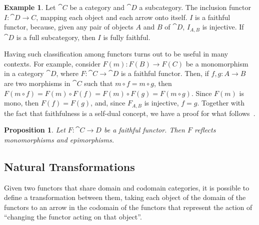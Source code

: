 \documentclass[a4paper, twoside,openright]{report}
\theoremstyle{plain}
\newtheorem{prop}[theorem]{Proposition}
\theoremstyle{definition}
\newtheorem{example}[theorem]{Example}
\newtheorem{obs}[theorem]{Observation}
\begin{document}
\color{black}
    

\begin{example}\label{ex:full_subc_inc_fully_faith}
    Let $\cat C$ be a category and $\cat D$ a subcategory. The inclusion functor $I: \cat{D \rightarrow C}$, mapping each object and each arrow onto itself. $I$ is a faithful functor, because, given any pair of objects $A$ and $B$ of $\cat D$, $I_{A, B}$ is injective. If $\cat D$ is a full subcategory, then $I$ is fully faithful.
\end{example}

Having such classification among functors turns out to be useful in many contexts. For example, consider $F(m): F(B) \rightarrow F(C)$ be a monomorphism in a category $\cat D$, where $F: \cat C \rightarrow \cat D$ is a faithful functor. Then, if $f, g: A \rightarrow B$ are two morphisms in $\cat C$ such that $m \circ f = m \circ g$, then $F(m \circ f) = F(m) \circ F(f) = F(m) \circ F(g) = F(m\circ g)$. Since $F(m)$ is mono, then $F(f) = F(g)$, and, since $F_{A, B}$ is injective, $f = g$. Together with the fact that faithfulness is a self-dual concept, we have a proof for what follows~\cite{Herrlich_Strecker_1979}.

\begin{prop}
    Let $F: \cat{C \rightarrow D}$ be a faithful functor. Then $F$ reflects monomorphisms and epimorphisms.
\end{prop}


\subsection{Natural Transformations}

Given two functors that share domain and codomain categories, it is possible to define a transformation between them, taking each object of the domain of the functors to an arrow in the codomain of the functors that represent the action of ``changing the functor acting on that object''.
\end{document}

